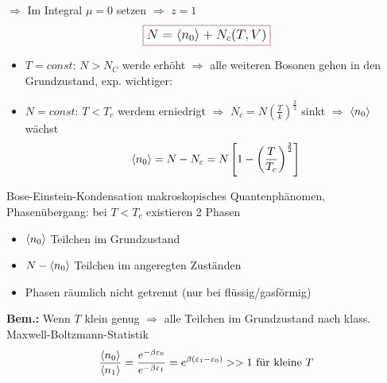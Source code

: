 $\Rightarrow$ Im Integral $\mu = 0$ setzen $\Rightarrow$ $z=1$
\begin{align}
    \fcolorbox{red}{white}{\large$N=\expval{n_0} + N_c(T,V)$}
\end{align}
\begin{itemize}
\item[]$T= const$: $N>N_C$ werde erhöht $\Rightarrow$ alle weiteren Bosonen gehen in den Grundzustand, exp. wichtiger:
\item[]$N=const$: $T<T_c$ werdem erniedrigt $\Rightarrow$ $N_c=N\left(\frac{T}{k}\right)^{\frac{3}{2}}$ sinkt $\Rightarrow$ $\expval{n_0}$ wächst
\begin{align}
    \expval{n_0}=N-N_c = N\left[1-\left(\frac{T}{T_c}\right)^{\frac{3}{2}}\right]
\end{align}
\end{itemize}
\begin{center}
\end{center}
\begin{definition}{Bose-Einstein-Kondensation}
    makroskopisches Quantenphänomen,
    Phasenübergang: bei $T<T_c$ existieren 2 Phasen
    \begin{itemize}
        \item $\expval{n_0}$ Teilchen im Grundzustand
        \item $N-\expval{n_0}$ Teilchen im angeregten Zuständen
        \item Phasen räumlich nicht getrennt (nur bei flüssig/gasförmig)
    \end{itemize}
\end{definition}
\textbf{Bem.:} Wenn $T$ klein genug $\Rightarrow$ alle Teilchen im Grundzustand nach klass. Maxwell-Boltzmann-Statistik
\begin{align}
    \frac{\expval{n_0}}{\expval{n_1}} = \frac{e^{-\beta \varepsilon_0}}{e^{-\beta \varepsilon_1}}=e^{\beta(\varepsilon_1-\varepsilon_0)} >> 1 \text{ für kleine }T
\end{align}
